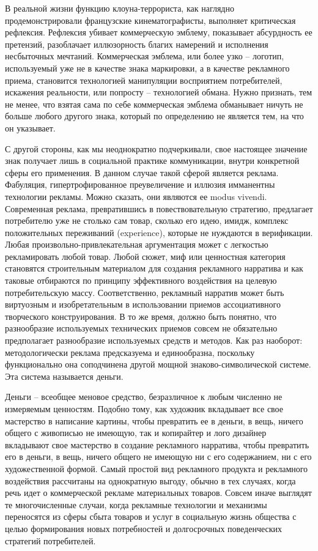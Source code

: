 В реальной жизни функцию клоуна-террориста, как наглядно продемонстрировали
французские кинематографисты, выполняет критическая рефлексия. Рефлексия убивает
коммерческую эмблему, показывает абсурдность ее претензий, разоблачает
иллюзорность благих намерений и исполнения несбыточных мечтаний. Коммерческая
эмблема, или более узко -- логотип, используемый уже не в качестве знака
маркировки, а в качестве рекламного приема, становится технологией манипуляции
восприятием потребителей, искажения реальности, или попросту --
технологией обмана. Нужно признать, тем не менее, что взятая сама по себе
коммерческая эмблема обманывает ничуть не больше любого другого знака, который
по определению не является тем, на что он указывает.

С другой стороны, как мы неоднократно подчеркивали, свое настоящее значение
знак получает лишь в социальной практике коммуникации, внутри конкретной
сферы его применения. В данном случае такой сферой является реклама. Фабуляция,
гипертрофированное преувеличение и иллюзия имманентны технологии рекламы. Можно
сказать, они являются ее modus vivendi. Современная реклама, превратившись в
повествовательную стратегию, предлагает потребителю уже не столько сам товар,
сколько его идею, имидж, комплекс положительных переживаний (experience),
которые не нуждаются в верификации. Любая произвольно-привлекательная аргументация
может с легкостью рекламировать любой товар. Любой сюжет, миф или ценностная
категория становятся строительным материалом для создания рекламного нарратива
и как таковые отбираются  по принципу эффективного воздействия на целевую
потребительскую массу. Соответственно, рекламный нарратив может быть виртуозным
и изобретательным в использовании приемов ассоциативного творческого
конструирования. В то же время, должно быть понятно, что разнообразие
используемых технических приемов совсем не обязательно предполагает разнообразие
используемых средств и методов. Как раз наоборот: методологически реклама
предсказуема и единообразна, поскольку функционально она соподчинена другой
мощной знаково-символической системе. Эта система называется деньги.

Деньги -- всеобщее меновое средство, безразличное к любым численно не
измеряемым ценностям. Подобно тому, как художник вкладывает все свое мастерство
в написание картины, чтобы превратить ее в деньги, в вещь, ничего общего с
живописью не имеющую, так и копирайтер и лого дизайнер вкладывают свое
мастерство в создание рекламного  нарратива, чтобы превратить его в деньги,
в вещь, ничего общего не имеющую ни с его  содержанием, ни с его художественной
формой. Самый простой вид рекламного продукта и рекламного воздействия
рассчитаны на однократную выгоду, обычно в тех случаях, когда речь идет о
коммерческой рекламе материальных товаров.  Совсем иначе выглядят те
многочисленные случаи, когда рекламные технологии и механизмы переносятся из
сферы сбыта товаров и услуг в социальную жизнь общества с целью формирования
новых потребностей и долгосрочных поведенческих стратегий потребителей.

